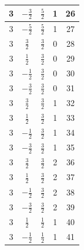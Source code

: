 \documentclass{article}
\begin{document}
\begin{tabular}{|c|c|c|c|c|}
           3 & $-\frac{3}{2}$& $\frac{5}{2}$&1&26 \\\hline       
           3 & $-\frac{5}{2}$& $\frac{5}{2}$&1&27 \\\hline       
           3 & $\frac{3}{2}$& $\frac{3}{2}$&0&28\\\hline       
           3 & $\frac{1}{2}$& $\frac{3}{2}$&0&29 \\\hline       
           3 & $-\frac{1}{2}$& $\frac{3}{2}$&0&30 \\\hline       
           3 & $-\frac{3}{2}$& $\frac{3}{2}$&0&31 \\\hline
           3 & $\frac{3}{2}$& $\frac{3}{2}$&1&32 \\\hline       
           3 & $\frac{1}{2}$& $\frac{3}{2}$&1&33 \\\hline       
           3 & $-\frac{1}{2}$& $\frac{3}{2}$&1&34 \\\hline       
           3 & $-\frac{3}{2}$& $\frac{3}{2}$&1&35 \\\hline
           3 & $\frac{3}{2}$& $\frac{3}{2}$&2&36 \\\hline       
           3 & $\frac{1}{2}$& $\frac{3}{2}$&2&37 \\\hline       
           3 & $-\frac{1}{2}$& $\frac{3}{2}$&2&38 \\\hline       
           3 & $-\frac{3}{2}$& $\frac{3}{2}$&2&39 \\\hline       
           3 & $\frac{1}{2}$& $\frac{1}{2}$&1&40 \\\hline
           3 & $-\frac{1}{2}$& $\frac{1}{2}$&1&41 \\\hline       
       \end{tabular}
\end{document}
